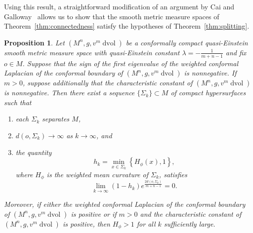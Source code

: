 \documentclass{amsart}
\newtheorem{prop}[thm]{Proposition}
\theoremstyle{definition}
\theoremstyle{remark}
\numberwithin{equation}{section}
\begin{document}
Using this result, a straightforward modification of an argument by Cai and Galloway~\cite[Section~3]{CaiGalloway1999} allows us to show that the smooth metric measure spaces of Theorem~\ref{thm:connectedness} satisfy the hypotheses of Theorem~\ref{thm:splitting}.

\begin{prop}
\label{prop:hypersurfaces_to_infinity}
Let $(M^n,g,v^m\operatorname{dvol})$ be a conformally compact quasi-Einstein smooth metric measure space with quasi-Einstein constant $\lambda=-\frac{1}{m+n-1}$ and fix $o\in M$.  Suppose that the sign of the first eigenvalue of the weighted conformal Laplacian of the conformal boundary of $(M^n,g,v^m\operatorname{dvol})$ is nonnegative.  If $m>0$, suppose additionally that the characteristic constant of $(M^n,g,v^m\operatorname{dvol})$ is nonnegative.  Then there exist a sequence $\{\Sigma_k\}\subset M$ of compact hypersurfaces such that
\begin{enumerate}
\item each $\Sigma_k$ separates $M$,
\item $d(o,\Sigma_k)\to\infty$ as $k\to\infty$, and
\item the quantity
\[ h_k = \min_{x\in\Sigma_k}\left\{ H_\phi(x), 1\right\}, \]
where $H_\phi$ is the weighted mean curvature of $\Sigma_k$, satisfies
\begin{equation}
\label{eqn:mean_curvature_decay}
\lim_{k\to\infty} (1-h_k)e^{\frac{2d(o,\Sigma_k)}{m+n-1}} = 0 .
\end{equation}
\end{enumerate}
Moreover, if either the weighted conformal Laplacian of the conformal boundary of $(M^n,g,v^m\operatorname{dvol})$ is positive or if $m>0$ and the characteristic constant of $(M^n,g,v^m\operatorname{dvol})$ is positive, then $H_\phi>1$ for all $k$ sufficiently large.
\end{prop}
\end{document}
